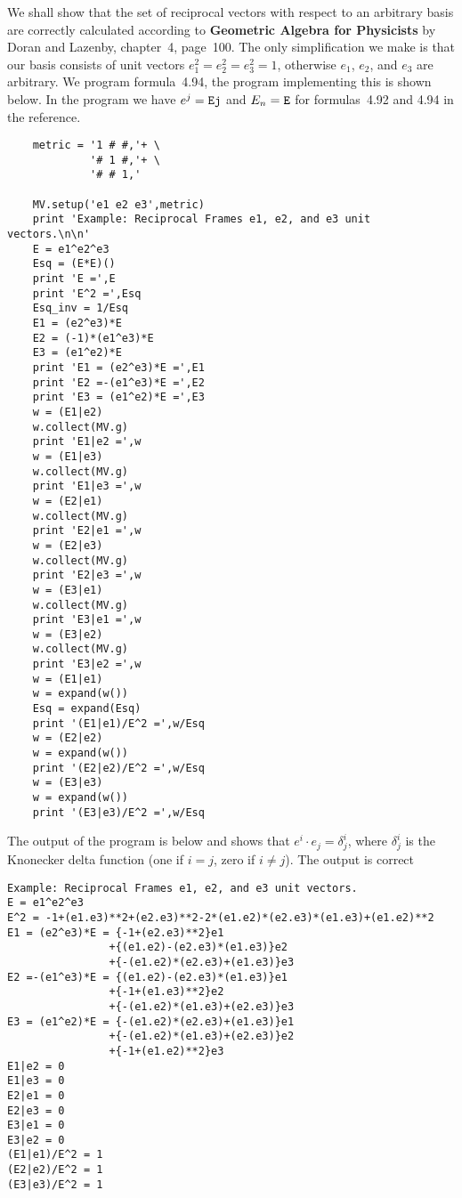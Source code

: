 \documentclass{article}
\begin{document}
We shall show that the set of reciprocal vectors with respect to an arbitrary basis are
correctly calculated according to {\bf Geometric Algebra for Physicists} by Doran and Lazenby,
chapter~4, page~100. The only simplification we make is that our basis consists of unit
vectors $e_{1}^{2} = e_{2}^{2} = e_{3}^{2} = 1$, otherwise $e_{1}$, $e_{2}$, and $e_{3}$
are arbitrary. We program formula~4.94, the program implementing this is shown below. In
the program we have $e^{j} = {\tt Ej}$ and $E_{n} = {\tt E}$ for formulas~4.92 and 4.94 in
the reference. 
\begin{verbatim}
    metric = '1 # #,'+ \
             '# 1 #,'+ \
             '# # 1,'

    MV.setup('e1 e2 e3',metric)
    print 'Example: Reciprocal Frames e1, e2, and e3 unit vectors.\n\n'
    E = e1^e2^e3
    Esq = (E*E)()
    print 'E =',E
    print 'E^2 =',Esq
    Esq_inv = 1/Esq
    E1 = (e2^e3)*E
    E2 = (-1)*(e1^e3)*E
    E3 = (e1^e2)*E
    print 'E1 = (e2^e3)*E =',E1
    print 'E2 =-(e1^e3)*E =',E2
    print 'E3 = (e1^e2)*E =',E3
    w = (E1|e2)
    w.collect(MV.g)
    print 'E1|e2 =',w
    w = (E1|e3)
    w.collect(MV.g)
    print 'E1|e3 =',w
    w = (E2|e1)
    w.collect(MV.g)
    print 'E2|e1 =',w
    w = (E2|e3)
    w.collect(MV.g)
    print 'E2|e3 =',w
    w = (E3|e1)
    w.collect(MV.g)
    print 'E3|e1 =',w
    w = (E3|e2)
    w.collect(MV.g)
    print 'E3|e2 =',w
    w = (E1|e1)
    w = expand(w())
    Esq = expand(Esq)
    print '(E1|e1)/E^2 =',w/Esq
    w = (E2|e2)
    w = expand(w())
    print '(E2|e2)/E^2 =',w/Esq
    w = (E3|e3)
    w = expand(w())
    print '(E3|e3)/E^2 =',w/Esq
\end{verbatim}
The output of the program is below and shows that $e^{i}\cdot e_{j} = \delta^{i}_{j}$,
where $\delta^{i}_{j}$ is the Knonecker delta function (one if $i = j$, zero if $i \ne j$).  
The output is correct
\begin{verbatim}
Example: Reciprocal Frames e1, e2, and e3 unit vectors.
E = e1^e2^e3
E^2 = -1+(e1.e3)**2+(e2.e3)**2-2*(e1.e2)*(e2.e3)*(e1.e3)+(e1.e2)**2
E1 = (e2^e3)*E = {-1+(e2.e3)**2}e1
                +{(e1.e2)-(e2.e3)*(e1.e3)}e2
                +{-(e1.e2)*(e2.e3)+(e1.e3)}e3
E2 =-(e1^e3)*E = {(e1.e2)-(e2.e3)*(e1.e3)}e1
                +{-1+(e1.e3)**2}e2
                +{-(e1.e2)*(e1.e3)+(e2.e3)}e3
E3 = (e1^e2)*E = {-(e1.e2)*(e2.e3)+(e1.e3)}e1
                +{-(e1.e2)*(e1.e3)+(e2.e3)}e2
                +{-1+(e1.e2)**2}e3
E1|e2 = 0
E1|e3 = 0
E2|e1 = 0
E2|e3 = 0
E3|e1 = 0
E3|e2 = 0
(E1|e1)/E^2 = 1
(E2|e2)/E^2 = 1
(E3|e3)/E^2 = 1
\end{verbatim}
\end{document}
